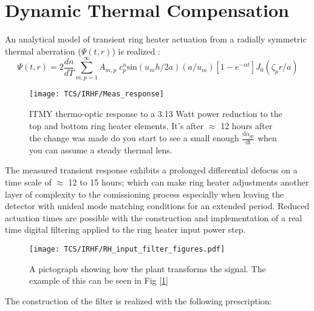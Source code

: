 \section{Dynamic Thermal Compensation}
An analytical model of transient ring heater actuation from a radially symmetric thermal aberration ($\Psi(t,r)$) is realized \cite{Ramette:16}:
\begin{equation}
	\Psi(t,r)=2\frac{dn}{dT} \sum^{\infty}_{m,p = 1} A_{m,p} \; c^{u}_{p} \mathrm{sin}(u_m h /2a) (a/u_m)[1-e^{-\alpha t}] J_0(\zeta_p r/a)
\end{equation}

\begin{figure}[H]
 \texttt{[image: TCS/IRHF/Meas\_response]}
 \caption{ITMY thermo-optic response to a 3.13 Watt power reduction to the top and bottom ring heater elements. It's after $\approx$ 12 hours after the change was made do you start to see a small enough $\frac{\mathrm{d} \alpha_\mathrm{sp}}{\mathrm{dt}}$ when you can assume a steady thermal lens.}
 \label{fig:meas}
\end{figure}

The measured transient response exhibits a prolonged differential defocus on a time scale of $\approx$ 12 to 15 hours; which can make ring heater adjustments another layer of complexity to the comissioning process especially when leaving the detector with unideal mode matching conditions for an extended period. Reduced actuation times are possible with the construction and implementation of a real time digital filtering applied to the ring heater input power step.

\begin{figure}[H]
\centering
\texttt{[image: TCS/IRHF/RH\_input\_filter\_figures.pdf]}
\caption{A pictograph showing how the plant transforms the signal. The example of this can be seen in Fig [\ref{fig:meas}]}
\label{fig:justplant}
\end{figure}

The construction of the filter is realized with the following prescription:


